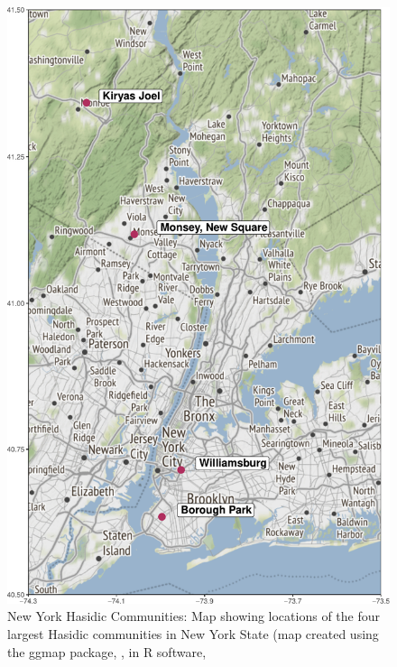 \documentclass[output=paper]{langsci/langscibook}
\begin{document}
\begin{figure}
\includegraphics[width=.875\textwidth]{figures/nove-fig1-color.pdf}
\caption{New York Hasidic Communities: Map showing  locations of the four largest Hasidic communities in New York State (map created using the ggmap package, \citealt{KahleWickham2013}, in R software, \citealt{RCore2017}}\label{fig:nove:1}
\end{figure}
\end{document}
